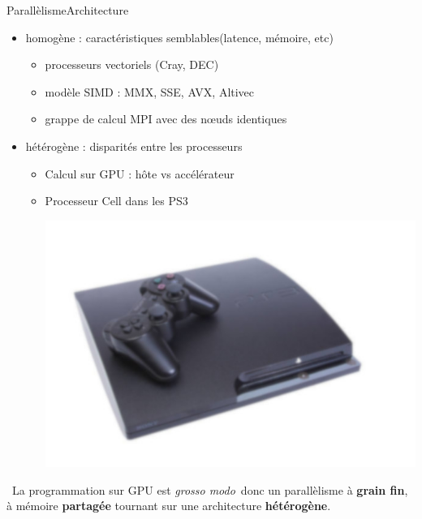\documentclass[11pt,mathserif]{beamer}
\newcommand{\hand}{\faHandORight}
\begin{document}
\begin{frame}{Parallèlisme}{Architecture}
\begin{itemize}[<+->]
  \item homogène : caractéristiques semblables(latence, mémoire, etc)
   \begin{itemize}
     \item processeurs vectoriels (Cray, DEC)
     \item modèle SIMD : MMX, SSE, AVX, Altivec
     \item grappe de calcul MPI avec des nœuds identiques
   \end{itemize}
  \item hétérogène : disparités entre les processeurs
   \begin{itemize}
     \item Calcul sur GPU : hôte vs accélérateur
     \item \begin{minipage}[r]{0.49\linewidth} 
         Processeur Cell dans les PS3 
      \end{minipage}
      \begin{minipage}[r]{0.49\linewidth}
        \includegraphics[width=0.6\linewidth]{fig/ps3_lauso.jpg}
      \end{minipage}
\end{itemize}
\end{itemize}
\pause
  \hand\  La programmation sur GPU est {\it grosso modo}\  donc un parallèlisme à {\bf grain fin}, à mémoire {\bf partagée} tournant sur
  une architecture {\bf hétérogène}.
\end{frame}
\end{document}
